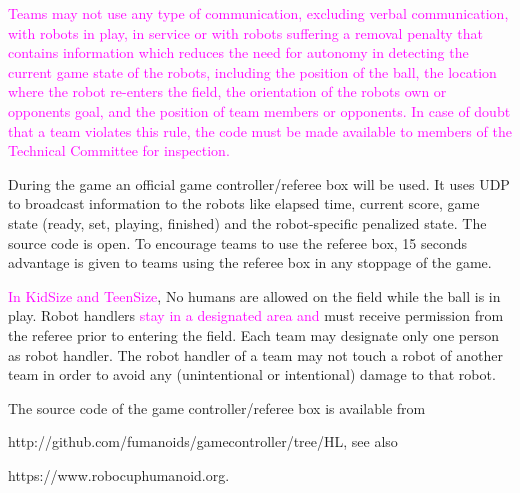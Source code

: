 \textcolor{magenta}{Teams may not use any type of communication, excluding verbal communication, with robots in play, in service or with robots suffering a removal penalty that contains information which reduces the need for autonomy in detecting the current game state of the robots, including the position of the ball, the location where the robot re-enters the field, the orientation of the robots own or opponents goal, and the position of team members or opponents. In case of doubt that a team violates this rule, the code must be made available to members of the Technical Committee for inspection.}

\bigskip

During the game an official game controller/referee box will be used. It uses UDP to broadcast information to the robots like elapsed time, current score, game state (ready, set, playing, finished) and the robot-specific penalized state. The source code is open. To encourage teams to use the referee box, 15 seconds advantage is given to teams using the referee box in any stoppage of the game.



\bigskip

\textcolor{magenta}{In KidSize and TeenSize}, No humans are allowed on the field while the ball is in play. Robot handlers \textcolor{magenta}{stay in a designated area and} must receive permission from the referee prior to entering the field. Each team may designate only one person as robot handler. The robot handler of a team may not touch a robot of another team in order to avoid any (unintentional or intentional) damage to that robot. 

\bigskip

The source code of the game controller/referee box is available from 

\textcolor[rgb]{0.0,0.0,0.49803922}{http://github.com/fumanoids/gamecontroller/tree/HL},
see also 

\textcolor[rgb]{0.0,0.0,0.49803922}{https://www.robocuphumanoid.org}.

